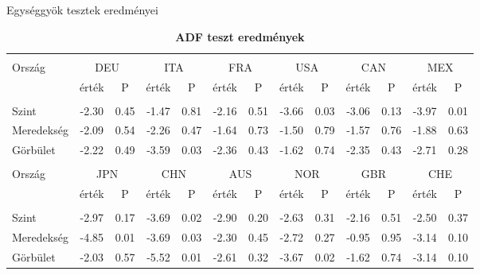 \documentclass[12pt,bibliography=totoc]{article}
\begin{document}
\bigskip

\begin{table}
\caption{Egységgyök tesztek eredményei}
\fontsize{10}{10}\selectfont
\centering%
\captionsetup{justification=centering}

\begin{subtable}[t]{1\textwidth}
\centering%
\begin{tabular}{l cc cc cc cc cc cc}
\hline\hline \\ [-1.5ex]                         
 

Ország	&	\multicolumn{2}{c}{DEU}			&	\multicolumn{2}{c}{ITA}			&	\multicolumn{2}{c}{FRA}			&	\multicolumn{2}{c}{USA}			&	\multicolumn{2}{c}{CAN}			&	\multicolumn{2}{c}{MEX}			\\[0.5ex] 

& érték &P 		& érték &P 			& érték &P  		& érték& P         			& érték &P				& érték &P\\

\hline       \\ [-1.5ex] 

Szint	&	-2.30	&	0.45	&	-1.47	&	0.81	&	-2.16	&	0.51	&	-3.66	&	0.03	&	-3.06	&	0.13	&	-3.97	&	0.01	\\
Meredekség	&	-2.09	&	0.54	&	-2.26	&	0.47	&	-1.64	&	0.73	&	-1.50	&	0.79	&	-1.57	&	0.76	&	-1.88	&	0.63	\\
\medskip
Görbület	&	-2.22	&	0.49	&-3.59	&0.03	&	-2.36	&	0.43	&	-1.62	&	0.74	&	-2.35	&	0.43	&	-2.71	&	0.28	\\

\hline   \\ [-1.5ex]    

Ország	&	\multicolumn{2}{c}{JPN}			&	\multicolumn{2}{c}{CHN}			&	\multicolumn{2}{c}{AUS}			&	\multicolumn{2}{c}{NOR}			&	\multicolumn{2}{c}{GBR}			&	\multicolumn{2}{c}{CHE}			\\

 & érték &P & érték &P& érték &P & érték &P& érték &P & érték &P\\

\hline       \\ [-1.5ex] 

Szint	&	-2.97	&	0.17	&	-3.69	&	0.02	&	-2.90	&	0.20	&	-2.63	&	0.31	&	-2.16	&	0.51	&	-2.50	&	0.37	\\
Meredekség	&	-4.85	&	0.01	&	-3.69	&	0.03	&	-2.30	&	0.45	&	-2.72	&	0.27	&	-0.95	&	0.95	&	-3.14	&	0.10	\\
Görbület	&	-2.03	&0.57	&	-5.52	&	0.01	&	-2.61	&	0.32	&	-3.67	&	0.02	&	-1.62	&	0.74	&	-3.14	&	0.10	\\
\hline
\end{tabular}
\caption{\textbf{ADF teszt eredmények}}
\end{subtable}
\hspace{\fill}
\bigskip 


\end{table}
\end{document}
